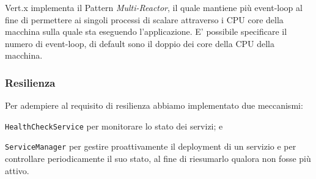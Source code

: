 \documentclass[a4paper]{article}
\begin{document}
Vert.x implementa il Pattern \textit{Multi-Reactor}, il quale mantiene più event-loop al fine di permettere ai singoli processi di scalare attraverso i CPU core della macchina sulla quale sta eseguendo l'applicazione.
E' possibile specificare il numero di event-loop, di default sono il doppio dei core della CPU della macchina. 

\subsubsection{Resilienza}
Per adempiere al requisito di resilienza abbiamo implementato due meccanismi:
\begin{enumerate*}[label=(\arabic*)]
    \item \texttt{HealthCheckService} per monitorare lo stato dei servizi; e
    \item \texttt{ServiceManager} per gestire proattivamente il deployment di un servizio e per controllare periodicamente il suo stato, al fine di riesumarlo qualora non fosse più attivo.
\end{enumerate*}
\end{document}
